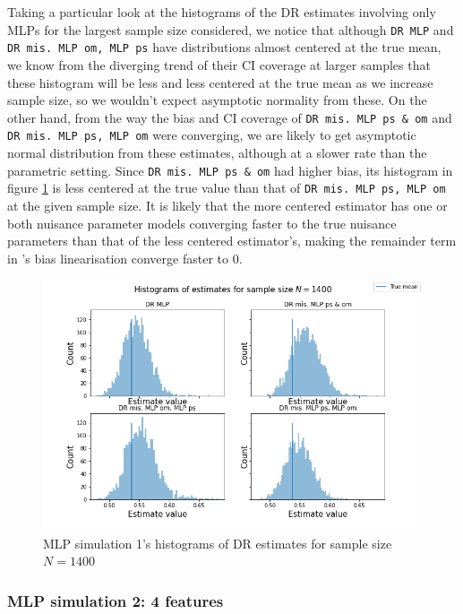\documentclass[12pt,twoside]{article}
\begin{document}
Taking a particular look at the histograms of the DR estimates involving only MLPs for the largest sample size considered, we notice that although \texttt{DR MLP} and \texttt{DR mis. MLP om, MLP ps} have distributions almost centered at the true mean, we know from the diverging trend of their CI coverage at larger samples that these histogram will be less and less centered at the true mean as we increase sample size, so we wouldn't expect asymptotic normality from these. On the other hand, from the way the bias and CI coverage of \texttt{DR mis. MLP ps \& om} and \texttt{DR mis. MLP ps, MLP om} were converging, we are likely to get asymptotic normal distribution from these estimates, although at a slower rate than the parametric setting. Since \texttt{DR mis. MLP ps \& om} had higher bias, its histogram in figure \ref{fighistMLP} is less centered at the true value than that of \texttt{DR mis. MLP ps, MLP om} at the given sample size. It is likely that the more centered estimator has one or both nuisance parameter models converging faster to the true nuisance parameters than that of the less centered estimator's, making the remainder term in \cite{benkeser2017}'s bias linearisation converge faster to 0.

\begin{figure}[h!]
    \centering
    \includegraphics[width = 0.9\columnwidth]{figures/histMLP.png}
    \caption{MLP simulation 1's histograms of DR estimates for sample size $N = 1400$}
    \label{fighistMLP}
\end{figure}

\clearpage
\subsubsection{MLP simulation 2: 4 features}
\end{document}

